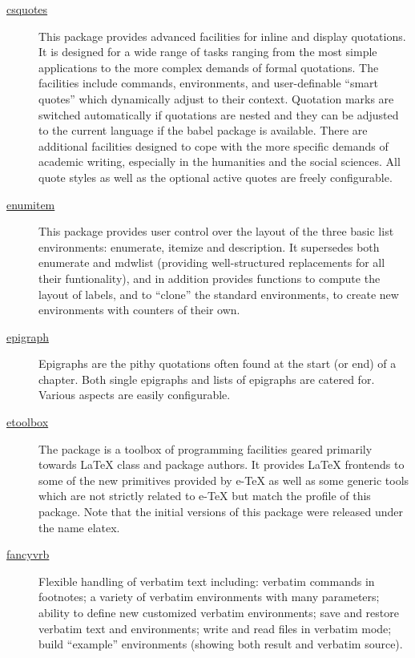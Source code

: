 \begin{description}
	\item[\href{https://www.ctan.org/pkg/csquotes}{csquotes}] This package provides advanced facilities for inline and display quotations. It is designed for a wide range of tasks ranging from the most simple applications to the more complex demands of formal quotations. The facilities include commands, environments, and user-definable \enquote{smart quotes} which dynamically adjust to their context. Quotation marks are switched automatically if quotations are nested and they can be adjusted to the current language if the babel package is available. There are additional facilities designed to cope with the more specific demands of academic writing, especially in the humanities and the social sciences. All quote styles as well as the optional active quotes are freely configurable. \cite{CTANTeam.2020am}
	
	\item[\href{https://www.ctan.org/pkg/enumitem}{enumitem}] This package provides user control over the layout of the three basic list environments: enumerate, itemize and description. It supersedes both enumerate and mdwlist (providing well-structured replacements for all their funtionality), and in addition provides functions to compute the layout of labels, and to \enquote{clone} the standard environments, to create new environments with counters of their own. \cite{CTANTeam.2020g}
	
	\item[\href{https://www.ctan.org/pkg/epigraph}{epigraph}] Epigraphs are the pithy quotations often found at the start (or end) of a chapter. Both single epigraphs and lists of epigraphs are catered for. Various aspects are easily configurable. \cite{CTANTeam.2020ap}
	
	\item[\href{https://www.ctan.org/pkg/etoolbox}{etoolbox}] The package is a toolbox of programming facilities geared primarily towards {\LaTeX} class and package authors. It provides {\LaTeX} frontends to some of the new primitives provided by e-{\TeX} as well as some generic tools which are not strictly related to e-{\TeX} but match the profile of this package. Note that the initial versions of this package were released under the name elatex. \cite{CTANTeam.2020as}
	
	\item[\href{https://www.ctan.org/pkg/fancyvrb}{fancyvrb}] Flexible handling of verbatim text including: verbatim commands in footnotes; a variety of verbatim environments with many parameters; ability to define new customized verbatim environments; save and restore verbatim text and environments; write and read files in verbatim mode; build \enquote{example} environments (showing both result and verbatim source). \cite{CTANTeam.2020aq}
	

\end{description}
